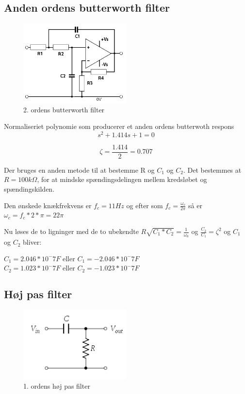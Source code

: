\subsection{Anden ordens butterworth filter}
\begin{figure}[H]
	\centering
	\includegraphics[width = 0.5\textwidth]{Implementeringsdokument/billeder/2ordensButterworth.png}
	\caption{2. ordens butterworth filter}\label{fig:butterworth}
\end{figure}
Normaliseriet polynomie som producerer et anden ordens butterwoth respons 
\begin{equation}
	s^2 + 1.414s +1 = 0 
\end{equation}

\begin{equation}
	\zeta = \frac{1.414}{2} = 0.707
\end{equation}

Der bruges en anden metode til at bestemme R og $C_1$ og $C_2$. Det bestemmes at $R = 100k \Omega $, for at mindske spændingsdelingen mellem kredsløbet og spændingskilden.

Den ønskede knækfrekvens er $f_c = 11Hz$ og efter som $f_c = \frac{\omega_c}{2 \pi} $ så er $\omega_c = f_c * 2 * \pi = 22 \pi $

Nu løses de to ligninger med de to ubekendte $R \sqrt{C_1 * C_2} = \frac{1}{\omega_0}$ og $ \frac{C_2}{C_1} = \zeta^2$ og $C_1$ og $C_2$ bliver:

$C_1 = 2.046*10^-7F$ eller $ C_1 = -2.046*10^-7F$ \\
$C_2 = 1.023*10^-7F$ eller $ C_2 = -1.023*10^-7F$ \\

\subsection{Høj pas filter}
\begin{figure}[H]
	\centering
	\includegraphics[width = 0.5\textwidth]{Implementeringsdokument/billeder/HighPass.png}
	\caption{1. ordens høj pas filter}\label{fig:highpass}
\end{figure}

